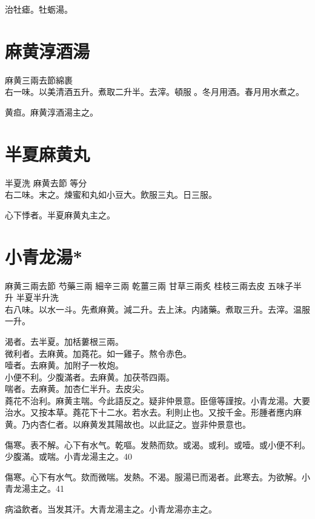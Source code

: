 治牡瘧。牡蛎湯。

\section{麻黄淳酒湯}

麻黄{\scriptsize 三兩去節綿裹}\\
右一味。以美清酒五升。煮取二升半。去滓。頓服{\sungii 𥁞}。冬月用酒。春月用水煮之。

黄疸。麻黄淳酒湯主之。

\section{半夏麻黄丸}

半夏{\scriptsize 洗} 麻黄{\scriptsize 去節{ }等分}\\
右二味。末之。煉蜜和丸如小豆大。飲服三丸。日三服。

心下悸者。半夏麻黄丸主之。

\section{小青龙湯*}

麻黄{\scriptsize 三兩去節} 芍藥{\scriptsize 三兩} 細辛{\scriptsize 三兩} 乾薑{\scriptsize 三兩} 甘草{\scriptsize 三兩炙} 桂枝{\scriptsize 三兩去皮} 五味子{\scriptsize 半升} 半夏{\scriptsize 半升洗}\\
右八味。以水一斗。先煮麻黄。減二升。去上沫。内諸藥。煮取三升。去滓。温服一升。

渴者。去半夏。加栝蔞根三兩。\\
微利者。去麻黄。加蕘花。如一雞子。熬令赤色。\\
噎者。去麻黄。加附子一枚炮。\\
小便不利。少腹滿者。去麻黄。加茯苓四兩。\\
喘者。去麻黄。加杏仁半升。去皮尖。\\
蕘花不治利。麻黄主喘。今此語反之。疑非仲景意。{\scriptsize 臣億等謹按。小青龙湯。大要治水。又按本草。蕘花下十二水。若水去。利則止也。又按千金。形腫者應内麻黄。乃内杏仁者。以麻黄发其陽故也。以此証之。豈非仲景意也。}

傷寒。表不解。心下有水气。乾嘔。发熱而欬。或渴。或利。或噎。或小便不利。少腹滿。或喘。小青龙湯主之。40

傷寒。心下有水气。欬而微喘。发熱。不渴。服湯已而渴者。此寒去。为欲解。小青龙湯主之。41

病溢飲者。当发其汗。大青龙湯主之。小青龙湯亦主之。

